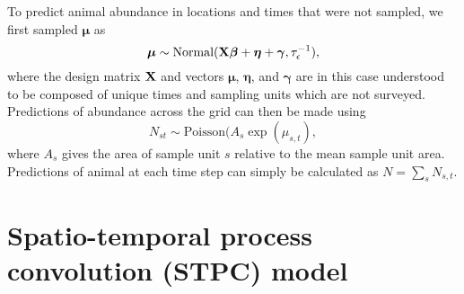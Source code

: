 \documentclass[12pt,fleqn]{article}
\begin{document}
\begin{flushleft}
To predict animal abundance in locations and times that were not sampled, we first sampled $\boldsymbol{\mu}$ as
\begin{equation*}
  \boldsymbol{\mu} \sim \textrm{Normal}({\bf X} \boldsymbol{\beta} + \boldsymbol{\eta} + \boldsymbol{\gamma},\tau_\epsilon^{-1}),
\end{equation*}
where the design matrix ${\bf X}$ and vectors $\boldsymbol{\mu}$, $\boldsymbol{\eta}$, and $\boldsymbol{\gamma}$ are in this case understood to be composed of unique times and sampling units which are not surveyed.
Predictions of abundance across the grid can then be made using
\begin{equation*}
  N_{st} \sim \textrm{Poisson}(A_s \exp(\mu_{s,t}),
\end{equation*}
where $A_s$ gives the area of sample unit $s$ relative to the mean sample unit area.  Predictions of animal at
each time step can simply be calculated as $N = \sum_s N_{s,t}$.

\section{Spatio-temporal process convolution (STPC) model}


\end{flushleft}
\end{document}
